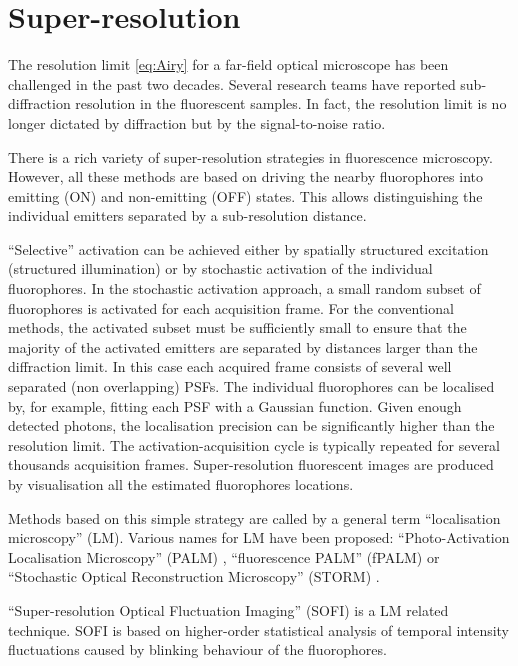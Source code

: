 
\section{Super-resolution\label{sec:super-resolution}}

The resolution limit \autoref{eq:Airy} for a far-field optical microscope has been challenged in the past two decades. Several research teams have reported sub-diffraction resolution in the fluorescent samples. In fact, the resolution limit is no longer dictated by diffraction but by the signal-to-noise ratio. 

There is a rich variety of super-resolution strategies in fluorescence microscopy. However, all these methods are based on driving the nearby fluorophores into emitting (ON) and non-emitting (OFF) states. This allows distinguishing the individual emitters separated by a sub-resolution distance.

``Selective'' activation can be achieved either by spatially structured excitation (structured illumination) or by stochastic activation of the individual fluorophores. In the stochastic activation approach, a small random subset of fluorophores is activated for each acquisition frame. For the conventional methods, the activated subset must be sufficiently small to ensure that the majority of the activated emitters are separated by distances larger than the diffraction limit. In this case each acquired frame consists of several well separated (non overlapping) PSFs. The individual fluorophores can be localised by, for example, fitting each PSF with a Gaussian function. Given enough detected photons, the localisation precision can be significantly higher than the resolution limit. The activation-acquisition cycle is typically repeated for several thousands acquisition frames. Super-resolution fluorescent images are produced by visualisation all the estimated fluorophores locations. 

Methods based on this simple strategy are called by a general term ``localisation microscopy'' (LM). Various names for LM have been proposed: ``Photo-Activation Localisation Microscopy'' (PALM) \cite{Betzig2006}, ``fluorescence PALM'' (fPALM) \cite{Hess2006} or ``Stochastic Optical Reconstruction Microscopy'' (STORM) \cite{Rust2006}.  

``Super-resolution Optical Fluctuation Imaging'' (SOFI) \cite{Dertinger2009} is a LM related technique. SOFI is based on higher-order statistical analysis of temporal intensity fluctuations caused by blinking behaviour of the fluorophores.

